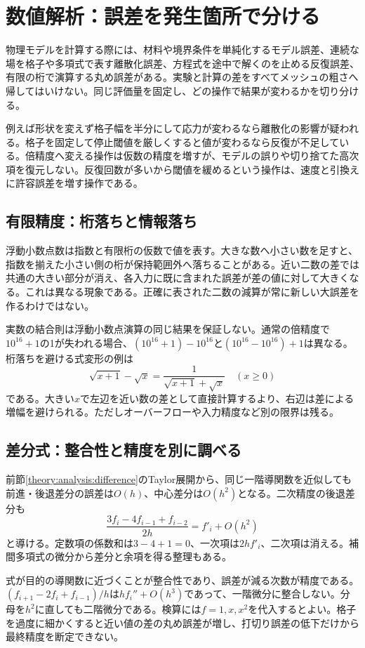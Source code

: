 \section{数値解析：誤差を発生箇所で分ける}
\label{theory:numerics:errors}
物理モデルを計算する際には、材料や境界条件を単純化するモデル誤差、連続な場を格子や多項式で表す離散化誤差、方程式を途中で解くのを止める反復誤差、有限の桁で演算する丸め誤差がある。実験と計算の差をすべてメッシュの粗さへ帰してはいけない。同じ評価量を固定し、どの操作で結果が変わるかを切り分ける。

例えば形状を変えず格子幅を半分にして応力が変わるなら離散化の影響が疑われる。格子を固定して停止閾値を厳しくすると値が変わるなら反復が不足している。倍精度へ変える操作は仮数の精度を増すが、モデルの誤りや切り捨てた高次項を復元しない。反復回数が多いから閾値を緩めるという操作は、速度と引換えに許容誤差を増す操作である。

\subsection{有限精度：桁落ちと情報落ち}
\label{theory:numerics:floating}
浮動小数点数は指数と有限桁の仮数で値を表す。大きな数へ小さい数を足すと、指数を揃えた小さい側の桁が保持範囲外へ落ちることがある。近い二数の差では共通の大きい部分が消え、各入力に既に含まれた誤差が差の値に対して大きくなる。これは異なる現象である。正確に表された二数の減算が常に新しい大誤差を作るわけではない\parencite{goldberg1991}。

実数の結合則は浮動小数点演算の同じ結果を保証しない。通常の倍精度で$10^{16}+1$の1が失われる場合、$(10^{16}+1)-10^{16}$と$(10^{16}-10^{16})+1$は異なる。桁落ちを避ける式変形の例は
\[
 \sqrt{x+1}-\sqrt{x}=\frac{1}{\sqrt{x+1}+\sqrt{x}}\quad(x\ge0)
\]
である。大きい$x$で左辺を近い数の差として直接計算するより、右辺は差による増幅を避けられる。ただしオーバーフローや入力精度など別の限界は残る。

\subsection{差分式：整合性と精度を別に調べる}
\label{theory:numerics:diff}
前節\ref{theory:analysis:difference}のTaylor展開から、同じ一階導関数を近似しても前進・後退差分の誤差は$O(h)$、中心差分は$O(h^2)$となる。二次精度の後退差分も
\[
 \frac{3f_i-4f_{i-1}+f_{i-2}}{2h}=f'_i+O(h^2)
\]
と導ける。定数項の係数和は$3-4+1=0$、一次項は$2hf'_i$、二次項は消える。補間多項式の微分から差分と余項を得る整理もある\parencite{nist_differentiation}。

式が目的の導関数に近づくことが整合性であり、誤差が減る次数が精度である。$(f_{i+1}-2f_i+f_{i-1})/h$は$hf_i''+O(h^3)$であって、一階微分に整合しない。分母を$h^2$に直しても二階微分である。検算には$f=1,x,x^2$を代入するとよい。格子を過度に細かくすると近い値の差の丸め誤差が増し、打切り誤差の低下だけから最終精度を断定できない。

